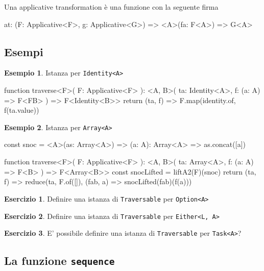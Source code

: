 \documentclass[12pt]{article}
\theoremstyle{definition}
\newtheorem{example}{Esempio}[section]
\newtheorem{exercise}{Esercizio}[section]
\newenvironment{code}
  {\vspace{0.5cm} \VerbatimEnvironment\begin{typescriptcode}}
  {\end{typescriptcode} \vspace{0.2cm}}
\begin{document}
Una applicative transformation è una funzione con la seguente firma

\begin{code}
at: (F: Applicative<F>, g: Applicative<G>) =>
  <A>(fa: F<A>) => G<A>
\end{code}

\subsection{Esempi}

\begin{example}
Istanza per \texttt{Identity<A>}

\begin{code}
function traverse<F>(
  F: Applicative<F>
): <A, B>(
  ta: Identity<A>,
  f: (a: A) => F<FB>
) => F<Identity<B>> {
  return (ta, f) => F.map(identity.of, f(ta.value))
}
\end{code}
\end{example}

\begin{example}
Istanza per \texttt{Array<A>}

\begin{code}
const snoc = <A>(as: Array<A>) => (a: A): Array<A> =>
  as.concat([a])

function traverse<F>(
  F: Applicative<F>
): <A, B>(
  ta: Array<A>,
  f: (a: A) => F<B>
) => F<Array<B>> {
  const snocLifted = liftA2(F)(snoc)
  return (ta, f) =>
    reduce(ta, F.of([]), (fab, a) => snocLifted(fab)(f(a)))
}
\end{code}
\end{example}

\begin{exercise}
Definire una istanza di \texttt{Traversable} per \texttt{Option<A>}
\end{exercise}

\begin{exercise}
Definire una istanza di \texttt{Traversable} per \texttt{Either<L, A>}
\end{exercise}

\begin{exercise}
E' possibile definire una istanza di \texttt{Traversable} per \texttt{Task<A>}?
\end{exercise}

\subsection{La funzione \texttt{sequence}}
\end{document}
